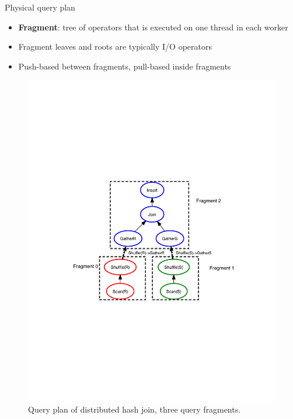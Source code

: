 \documentclass[mathserif,serif,handout]{beamer}
\begin{document}
\begin{frame}{Physical query plan}
\begin{itemize}
   \item \textbf{Fragment}: tree of operators that is executed on one thread in each worker
  	\item Fragment leaves and roots are typically I/O operators
    \item Push\--based between fragments, pull\--based inside fragments
  \end{itemize}

  \begin{figure}
   \begin{center}
       \includegraphics[width=.6\textwidth]{join}
     \end{center}
    \caption{Query plan of distributed hash join, three query fragments.}
  \end{figure}
\end{frame}
\end{document}

